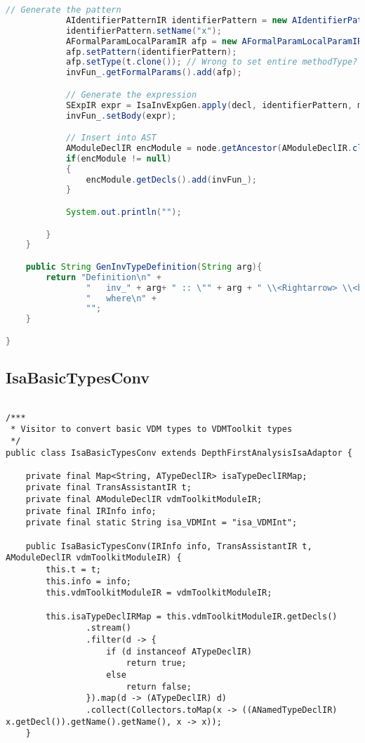 \begin{appendices}
\begin{lstlisting}[language=Java]
            // Generate the pattern
            AIdentifierPatternIR identifierPattern = new AIdentifierPatternIR();
            identifierPattern.setName("x");
            AFormalParamLocalParamIR afp = new AFormalParamLocalParamIR();
            afp.setPattern(identifierPattern);
            afp.setType(t.clone()); // Wrong to set entire methodType?
            invFun_.getFormalParams().add(afp);

            // Generate the expression
            SExpIR expr = IsaInvExpGen.apply(decl, identifierPattern, methodType.clone(), isaFuncDeclIRMap);
            invFun_.setBody(expr);

            // Insert into AST
            AModuleDeclIR encModule = node.getAncestor(AModuleDeclIR.class);
            if(encModule != null)
            {
                encModule.getDecls().add(invFun_);
            }

            System.out.println("");

        }
    }

    public String GenInvTypeDefinition(String arg){
        return "Definition\n" +
                "   inv_" + arg+ " :: \"" + arg + " \\<Rightarrow> \\<bool>\"\n" +
                "   where\n" +
                "";
    }

}
\end{lstlisting}

\subsection{IsaBasicTypesConv} \label{IsaBasicTypesConvbefore}
\begin{lstlisting}

/***
 * Visitor to convert basic VDM types to VDMToolkit types
 */
public class IsaBasicTypesConv extends DepthFirstAnalysisIsaAdaptor {

    private final Map<String, ATypeDeclIR> isaTypeDeclIRMap;
    private final TransAssistantIR t;
    private final AModuleDeclIR vdmToolkitModuleIR;
    private final IRInfo info;
    private final static String isa_VDMInt = "isa_VDMInt";

    public IsaBasicTypesConv(IRInfo info, TransAssistantIR t, AModuleDeclIR vdmToolkitModuleIR) {
        this.t = t;
        this.info = info;
        this.vdmToolkitModuleIR = vdmToolkitModuleIR;

        this.isaTypeDeclIRMap = this.vdmToolkitModuleIR.getDecls()
                .stream()
                .filter(d -> {
                    if (d instanceof ATypeDeclIR)
                        return true;
                    else
                        return false;
                }).map(d -> (ATypeDeclIR) d)
                .collect(Collectors.toMap(x -> ((ANamedTypeDeclIR) x.getDecl()).getName().getName(), x -> x));
    }


\end{lstlisting}
\end{appendices}

